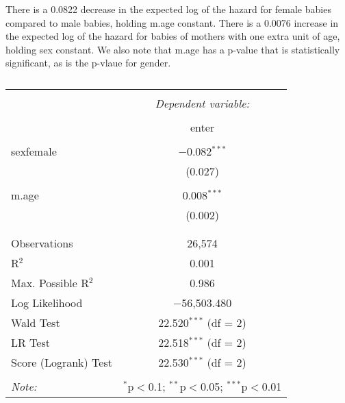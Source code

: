 \documentclass[12pt,letterpaper]{article}
\begin{document}


There is a 0.0822 decrease in the expected log of the hazard for female babies compared to male babies, holding m.age constant. There is a 0.0076 increase in the expected log of the hazard for babies of mothers with one extra unit of age, holding sex constant. We also note that m.age has a p-value that is statistically significant, as is the p-vlaue for gender. 

\begin{table}[!htbp] \centering 
	\caption{} 
	\label{} 
	\begin{tabular}{@{\extracolsep{5pt}}lc} 
		\\[-1.8ex]\hline 
		\hline \\[-1.8ex] 
		& \multicolumn{1}{c}{\textit{Dependent variable:}} \\ 
		\cline{2-2} 
		\\[-1.8ex] & enter \\ 
		\hline \\[-1.8ex] 
		sexfemale & $-$0.082$^{***}$ \\ 
		& (0.027) \\ 
		& \\ 
		m.age & 0.008$^{***}$ \\ 
		& (0.002) \\ 
		& \\ 
		\hline \\[-1.8ex] 
		Observations & 26,574 \\ 
		R$^{2}$ & 0.001 \\ 
		Max. Possible R$^{2}$ & 0.986 \\ 
		Log Likelihood & $-$56,503.480 \\ 
		Wald Test & 22.520$^{***}$ (df = 2) \\ 
		LR Test & 22.518$^{***}$ (df = 2) \\ 
		Score (Logrank) Test & 22.530$^{***}$ (df = 2) \\ 
		\hline 
		\hline \\[-1.8ex] 
		\textit{Note:}  & \multicolumn{1}{r}{$^{*}$p$<$0.1; $^{**}$p$<$0.05; $^{***}$p$<$0.01} \\ 
	\end{tabular} 
\end{table} 


\end{document}
